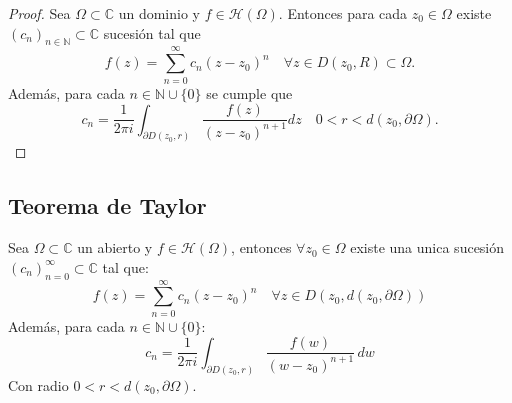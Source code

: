 \begin{proof}
    Sea $\Omega \subset \mathbb{C}$ un dominio y $f \in \mathcal{H}(\Omega)$. Entonces para cada $z_0 \in \Omega$ existe $(c_n)_{n \in \mathbb{N}} \subset \mathbb{C}$ sucesión tal que
    \[
        f(z) = \sum_{n=0}^{\infty} c_n (z - z_0)^n \quad \forall z \in D(z_0, R) \subset \Omega.
    \]
    Además, para cada $n \in \mathbb{N} \cup \{0\}$ se cumple que
    \[
        c_n = \frac{1}{2 \pi i} \int_{\partial D(z_0, r)} \frac{f(z)}{(z-z_0)^{n+1}} dz \quad 0 < r < d(z_0, \partial \Omega).
    \]
\end{proof}

\subsection{Teorema de Taylor}

\begin{teorema}
    Sea $\Omega \subset \mathbb{C}$ un abierto y $f \in \mathcal{H}(\Omega)$, entonces $\forall z_0 \in \Omega$ existe una unica sucesión $(c_n)_{n = 0}^{\infty} \subset \mathbb{C}$ tal que:
    \[
    f(z) = \sum_{n = 0}^{\infty} c_n (z - z_0)^n \quad 
    \forall z \in D(z_0, d(z_0, \partial \Omega))
    \]
    Además, para cada $n \in \mathbb{N} \cup \{0\}$:
    \[
    c_n =
    \frac{1}{2\pi i} 
    \int_{\partial D(z_0, r)} \frac{f(w)}{(w - z_0)^{n + 1}} \, dw
    \]
    Con radio $0 < r < d(z_0, \partial \Omega)$.
\end{teorema}

